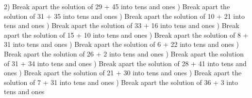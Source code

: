 \documentclass{article}%
\begin{document}
2) Break apart the solution of 29 + 45 into tens and ones%
\newline%
\newline%
) Break apart the solution of 31 + 35 into tens and ones%
\newline%
\newline%
) Break apart the solution of 10 + 21 into tens and ones%
\newline%
\newline%
) Break apart the solution of 33 + 16 into tens and ones%
\newline%
\newline%
) Break apart the solution of 15 + 10 into tens and ones%
\newline%
\newline%
) Break apart the solution of 8 + 31 into tens and ones%
\newline%
\newline%
) Break apart the solution of 6 + 22 into tens and ones%
\newline%
\newline%
) Break apart the solution of 26 + 2 into tens and ones%
\newline%
\newline%
) Break apart the solution of 31 + 34 into tens and ones%
\newline%
\newline%
) Break apart the solution of 28 + 41 into tens and ones%
\newline%
\newline%
) Break apart the solution of 21 + 30 into tens and ones%
\newline%
\newline%
) Break apart the solution of 7 + 31 into tens and ones%
\newline%
\newline%
) Break apart the solution of 36 + 3 into tens and ones%
\newline%
\end{document}
